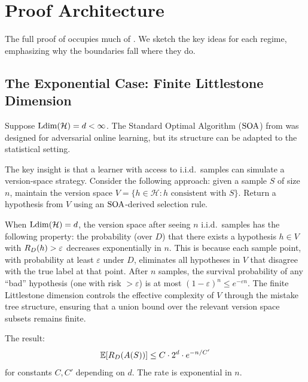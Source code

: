 
\section{Proof Architecture}
\label{sec:proof-sketch}

The full proof of  occupies much of
\cite{BousquetHannekeMoranVanHandelYehudayoff2021}.  We sketch the key ideas
for each regime, emphasizing why the boundaries fall where they do.


\subsection{The Exponential Case: Finite Littlestone Dimension}
\label{sec:exp-case}

Suppose $\mathrm{Ldim}(\mathcal{H}) = d < \infty$.  The Standard Optimal Algorithm
($\mathrm{SOA}$) from  was designed for adversarial online learning,
but its structure can be adapted to the statistical setting.

The key insight is that a learner with access to i.i.d.\ samples can
simulate a version-space strategy.  Consider the following approach: given a
sample $S$ of size $n$, maintain the version space
$V = \{h \in \mathcal{H} : h \text{ consistent with } S\}$.  Return a
hypothesis from $V$ using an $\mathrm{SOA}$-derived selection rule.

When $\mathrm{Ldim}(\mathcal{H}) = d$, the version space after seeing $n$ i.i.d.\
samples has the following property: the probability (over $D$) that there
exists a hypothesis $h \in V$ with $R_D(h) > \varepsilon$ decreases
exponentially in $n$.  This is because each sample point, with probability
at least $\varepsilon$ under $D$, eliminates all hypotheses in $V$ that
disagree with the true label at that point.  After $n$ samples, the survival
probability of any ``bad'' hypothesis (one with risk $> \varepsilon$) is at
most $(1 - \varepsilon)^n \leq e^{-\varepsilon n}$.  The finite Littlestone
dimension controls the effective complexity of $V$ through the mistake tree
structure, ensuring that a union bound over the relevant version space
subsets remains finite.

The result:
\[
  \mathbb{E}[R_D(A(S))] \leq C \cdot 2^d \cdot e^{-n/C'}
\]
for constants $C, C'$ depending on $d$.  The rate is exponential in $n$.

